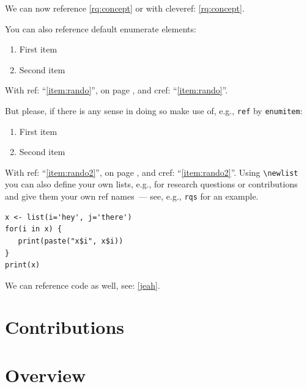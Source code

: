 We can now reference \ref{rq:concept} or with cleveref: \cref{rq:concept}.

You can also reference default enumerate elements:

\begin{enumerate}
   \item \label{item:rando}First item
   \item Second item
\end{enumerate}

With ref: \enquote{\ref{item:rando}}, on page \pageref{item:rando}, and cref: \enquote{\cref{item:rando}}. 

But please, if there is any sense in doing so make use of, e.g., \texttt{ref} by \texttt{enumitem}:

\begin{enumerate}[ref={Penguin Element \arabic*}]
   \item \label{item:rando2}First item
   \item Second item
\end{enumerate}

With ref: \enquote{\ref{item:rando2}}, on page \pageref{item:rando2}, and cref: \enquote{\cref{item:rando2}}.
Using \texttt{\textbackslash newlist} you can also define your own lists, e.g., for research questions or contributions and give them your own ref names~--- see, e.g., \texttt{rqs} for an example.


\begin{verbatim}
x <- list(i='hey', j='there')
for(i in x) {
   print(paste("x$i", x$i))
}
print(x)
\end{verbatim}

We can reference code as well, see: \cref{jeah}.

\section{Contributions}

\section{Overview}